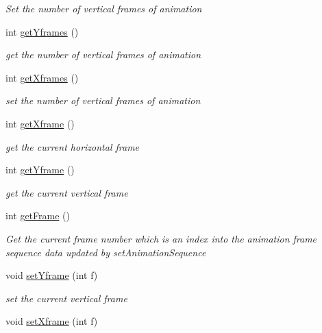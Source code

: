 \begin{DoxyCompactItemize}
\begin{DoxyCompactList}\small\item\em Set the number of vertical frames of animation \end{DoxyCompactList}\item 
int \mbox{\hyperlink{class_r_c___framework_1_1_sprite3_ac03a161791879ccf0758985c9dc49cce}{get\+Yframes}} ()
\begin{DoxyCompactList}\small\item\em get the number of vertical frames of animation \end{DoxyCompactList}\item 
int \mbox{\hyperlink{class_r_c___framework_1_1_sprite3_a838ca2253128f4f1099fa1ae24fe1fdf}{get\+Xframes}} ()
\begin{DoxyCompactList}\small\item\em set the number of vertical frames of animation \end{DoxyCompactList}\item 
int \mbox{\hyperlink{class_r_c___framework_1_1_sprite3_afce769592e5683b522e77fa1edf9e81e}{get\+Xframe}} ()
\begin{DoxyCompactList}\small\item\em get the current horizontal frame \end{DoxyCompactList}\item 
int \mbox{\hyperlink{class_r_c___framework_1_1_sprite3_a909a64848da044a82bc9e3467ea28ace}{get\+Yframe}} ()
\begin{DoxyCompactList}\small\item\em get the current vertical frame \end{DoxyCompactList}\item 
int \mbox{\hyperlink{class_r_c___framework_1_1_sprite3_a4c0a6cf29709e9c6f8ead39eea215f4b}{get\+Frame}} ()
\begin{DoxyCompactList}\small\item\em Get the current frame number which is an index into the animation frame sequence data updated by set\+Animation\+Sequence \end{DoxyCompactList}\item 
void \mbox{\hyperlink{class_r_c___framework_1_1_sprite3_a946e99f3317d07ce6a098c4b435e1689}{set\+Yframe}} (int f)
\begin{DoxyCompactList}\small\item\em set the current vertical frame \end{DoxyCompactList}\item 
void \mbox{\hyperlink{class_r_c___framework_1_1_sprite3_a56a7afacc321c80d0dfb1d9c5933f7df}{set\+Xframe}} (int f)

\end{DoxyCompactItemize}
